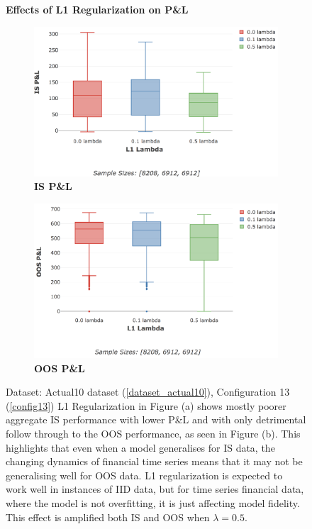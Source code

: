 \documentclass[a4paper,11pt,oneside]{article}
\theoremstyle{plain}
\theoremstyle{definition}
\begin{document}
	\begin{figure}[H]
		\centering
		\textbf{Effects of L1 Regularization on P\&L}
		\begin{subfigure}{.5\textwidth}
			\includegraphics[scale=0.305]{images/results/8_6_complexity/is_actual_pl_reg.png}
			\caption{\textbf{IS P\&L} }
			\label{figure-is_actual_pl_reg}
		\end{subfigure}%
		\begin{subfigure}{.5\textwidth}
			\includegraphics[scale=0.3]{images/results/8_6_complexity/oos_actual_pl_reg.png}
			\caption{\textbf{OOS P\&L} }
			\label{figure-oos_actual_pl_reg}
		\end{subfigure}
		\caption[Effects of L1 Regularization on P\&L]
		{Dataset: Actual10 dataset (\ref{dataset_actual10}),  Configuration 13 (\ref{config13})
			\newline L1 Regularization in Figure (a) shows mostly poorer aggregate IS performance with lower P\&L and with only detrimental follow through to the OOS performance, as seen in Figure (b). This highlights that even when a model generalises for IS data, the changing dynamics of financial time series means that it may not be generalising well for OOS data. L1 regularization is expected to work well in instances of IID data, but for time series financial data, where the model is not overfitting, it is just affecting model fidelity. This effect is amplified both IS and OOS when $\lambda = 0.5$.}
		\label{figure-results-reg}
	\end{figure}
	
\end{document}
